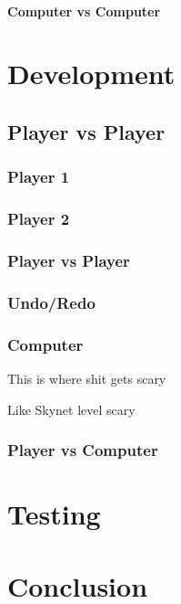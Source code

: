 \documentclass[10pt, a4paper]{article}
\begin{document}
    \paragraph{Computer vs Computer}
    \section{Development}
    \subsection{Player vs Player}
    \subsubsection{Player 1}
    \subsubsection{Player 2}
    \subsubsection{Player vs Player}
    \subsubsection{Undo/Redo}
    \subsubsection{Computer}
    This is where shit gets scary
    
    Like Skynet level scary
    \subsubsection{Player vs Computer}
    
    
    \section{Testing}
\section{Conclusion}	


		
\end{document}
